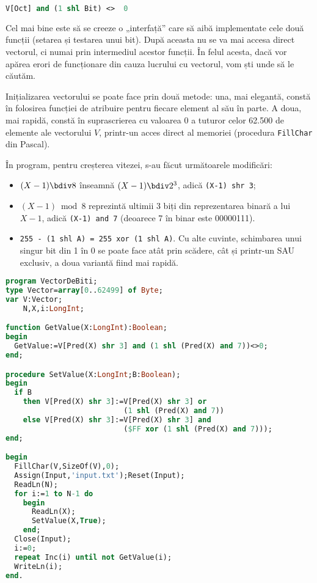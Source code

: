 \begin{lstlisting}[language=Pascal]
V[Oct] and (1 shl Bit) <>  0
\end{lstlisting}

Cel mai bine este să se creeze o „interfață” care să aibă implementate cele
două funcții (setarea și testarea unui bit). După aceasta nu se va mai accesa
direct vectorul, ci numai prin intermediul acestor funcții. În felul acesta,
dacă vor apărea erori de funcționare din cauza lucrului cu vectorul, vom ști
unde să le căutăm.

Inițializarea vectorului se poate face prin două metode: una, mai elegantă,
constă în folosirea funcției de atribuire pentru fiecare element al său în
parte. A doua, mai rapidă, constă în suprascrierea cu valoarea 0 a tuturor
celor 62.500 de elemente ale vectorului $V$, printr-un acces direct al
memoriei (procedura {\tt FillChar} din Pascal).

În program, pentru creșterea vitezei, s-au făcut următoarele modificări:

\begin{itemize}

\item $(X-1) \bdiv 8$ înseamnă $(X-1) \bdiv 2^3$, adică {\tt (X-1) shr 3};

\item $(X-1) \bmod 8$ reprezintă ultimii 3 biți din reprezentarea binară a
  lui $X - 1$, adică {\tt (X-1) and 7} (deoarece 7 în binar este 00000111).

\item {\tt 255 - (1 shl A) = 255 xor (1 shl A)}. Cu alte cuvinte, schimbarea
  unui singur bit din 1 în 0 se poate face atât prin scădere, cât și printr-un
  SAU exclusiv, a doua variantă fiind mai rapidă.

\end{itemize}

\begin{lstlisting}[language=Pascal]
program VectorDeBiti;
type Vector=array[0..62499] of Byte;
var V:Vector;
    N,X,i:LongInt;

function GetValue(X:LongInt):Boolean;
begin
  GetValue:=V[Pred(X) shr 3] and (1 shl (Pred(X) and 7))<>0;
end;

procedure SetValue(X:LongInt;B:Boolean);
begin
  if B
    then V[Pred(X) shr 3]:=V[Pred(X) shr 3] or
                           (1 shl (Pred(X) and 7))
    else V[Pred(X) shr 3]:=V[Pred(X) shr 3] and
                           ($FF xor (1 shl (Pred(X) and 7)));
end;

begin
  FillChar(V,SizeOf(V),0);
  Assign(Input,'input.txt');Reset(Input);
  ReadLn(N);
  for i:=1 to N-1 do
    begin
      ReadLn(X);
      SetValue(X,True);
    end;
  Close(Input);
  i:=0;
  repeat Inc(i) until not GetValue(i);
  WriteLn(i);
end.
\end{lstlisting}


